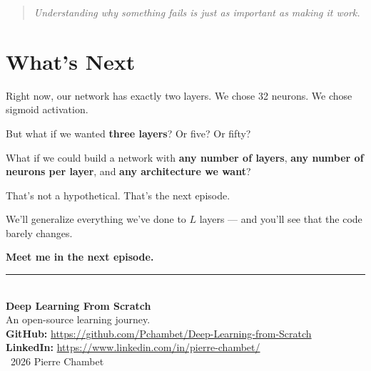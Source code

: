\documentclass[11pt]{article}
\begin{document}
\begin{quote}
\textit{Understanding why something fails is just as important as making it work.}
\end{quote}

\section{What's Next}

Right now, our network has exactly two layers. We chose 32 neurons. We chose sigmoid activation.

But what if we wanted \textbf{three layers}? Or five? Or fifty?

\begin{actionbox}[title=Next Stop --- Going Deeper]
What if we could build a network with \textbf{any number of layers}, \textbf{any number of neurons per layer}, and \textbf{any architecture we want}?

That's not a hypothetical. That's the next episode.

We'll generalize everything we've done to $L$ layers --- and you'll see that the code barely changes.

\textbf{Meet me in the next episode.}
\end{actionbox}

\vspace{2em}
\begin{center}
\rule{0.6\textwidth}{0.4pt}\\[1em]
{\small \textbf{Deep Learning From Scratch}}\\[0.3em]
{\small An open-source learning journey.}\\[0.8em]
{\small \textbf{GitHub:} \url{https://github.com/Pchambet/Deep-Learning-from-Scratch}}\\[0.3em]
{\small \textbf{LinkedIn:} \url{https://www.linkedin.com/in/pierre-chambet/}}\\[1em]
{\footnotesize \textcopyright\ 2026 Pierre Chambet}
\end{center}
\end{document}
